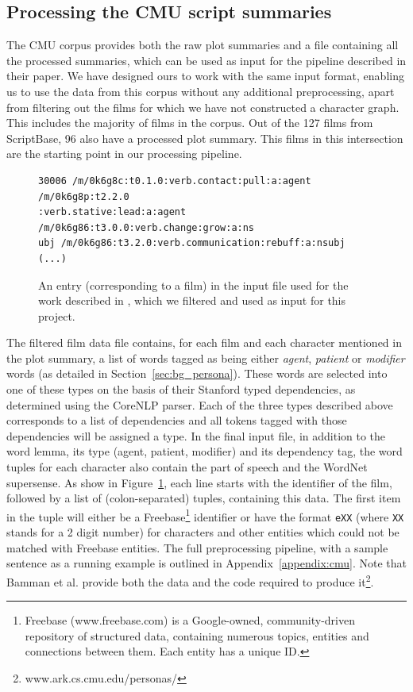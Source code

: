 \documentclass[bsc,frontabs,singlespacing,parskip, twoside]{infthesis}
\begin{document}
\subsection{Processing the CMU script summaries}
\label{sec:processing_cmu}
The CMU corpus provides both the raw plot summaries and a file containing all the processed summaries, which can be used as input for the pipeline described in their paper. We have designed ours to work with the same input format, enabling us to use the data from this corpus without any additional preprocessing, apart from filtering out the films for which we have not constructed a character graph. This includes the majority of films in the corpus. Out of the 127 films from ScriptBase, 96 also have a processed plot summary. This films in this intersection are the starting point in our processing pipeline.

\begin{figure}[h]
\centering
\begin{minipage}{14.5cm}
\begin{Verbatim}[frame=single]
30006 /m/0k6g8c:t0.1.0:verb.contact:pull:a:agent /m/0k6g8p:t2.2.0
:verb.stative:lead:a:agent /m/0k6g86:t3.0.0:verb.change:grow:a:ns
ubj /m/0k6g86:t3.2.0:verb.communication:rebuff:a:nsubj (...)
\end{Verbatim}
\end{minipage}
\caption{An entry (corresponding to a film) in the input file used for the work described in \cite{Bamman2013}, which we filtered and used as input for this project.}
\label{fig:bamman_input}
\end{figure}


The filtered film data file contains, for each film and each character mentioned in the plot summary, a list of words tagged as being either \textit{agent}, \textit{patient} or \textit{modifier} words (as detailed in Section~\ref{sec:bg_persona}). These words are selected into one of these types on the basis of their Stanford typed dependencies, as determined using the CoreNLP parser. Each of the three types described above corresponds to a list of dependencies and all tokens tagged with those dependencies will be assigned a type. In the final input file, in addition to the word lemma, its type (agent, patient, modifier) and its dependency tag, the word tuples for each character also contain the part of speech and the WordNet supersense. As show in Figure~\ref{fig:bamman_input}, each line starts with the identifier of the film, followed by a list of (colon-separated) tuples, containing this data. The first item in the tuple will either be a Freebase\footnote{Freebase (www.freebase.com) is a Google-owned, community-driven repository of structured data, containing numerous topics, entities and connections between them. Each entity has a unique ID.} identifier or have the format \texttt{eXX} (where \texttt{XX} stands for a 2 digit number) for characters and other entities which could not be matched with Freebase entities. The full preprocessing pipeline, with a sample sentence as a running example is outlined in Appendix~\ref{appendix:cmu}. Note that Bamman et al. provide both the data and the code required to produce it\footnote{www.ark.cs.cmu.edu/personas/}.
\end{document}
